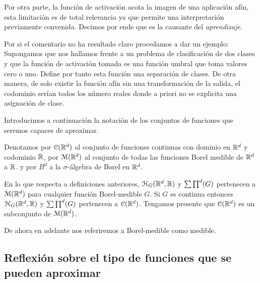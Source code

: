 Por otra parte, la función de activación acota la imagen de una aplicación afín, esta limitación 
es de total relevancia ya que permite una interpretación previamente convenida. 
Decimos por ende que es la causante del \textit{aprendizaje}.     

Por si el comentario no ha resultado claro procedamos a dar un ejemplo:   
Supongamos que nos hallamos frente a un problema de clasificación de dos clases y que la función de activación
tomada es una función umbral que toma valores cero o uno. Define por tanto esta función una separación de clases. 
De otra manera, de solo existir la función afín sin una transformación de la salida, el codominio serían 
todos los número reales donde a priori no se explicita una asignación de clase.  

Introducimos a continuación la notación de los conjuntos de funciones que seremos capaces de aproximar.  

Denotamos por  $\mathcal{C}(\mathbb{R}^d)$ al conjunto de funciones continuas con dominio en $\mathbb{R}^d$ y codominio $\mathbb{R}$,
por  $\mathcal{M}(\mathbb{R}^d)$ al conjunto de todas las funciones Borel medible de $\mathbb{R}^d$ a $\mathbb{R}$. 
y por $B^d$ a la $\sigma$-álgebra de Borel en $\mathbb{R} ^d$. 

En lo que respecta a definiciones anteriores, $\mathcal{H}_G(\mathbb{R}^d,\mathbb{R})$ y $\sum \prod^d (G)$ pertenecen a 
$\mathcal{M}(\mathbb{R}^d)$ para cualquier función Borel-medible $G$. Si $G$ es continua entonces 
$\mathcal{H}_G(\mathbb{R}^d,\mathbb{R})$ y $\sum \prod^d (G)$ pertenecen a $\mathcal{C}(\mathbb{R}^d)$. Tengamos presente que $\mathcal{C}(\mathbb{R}^d)$ es un subconjunto
de $\mathcal{M}(\mathbb{R}^d)$.  

De ahora en adelante nos referiremos a Borel-medible como medible. 
  

\subsection{ Reflexión sobre el tipo de funciones que se pueden aproximar}

